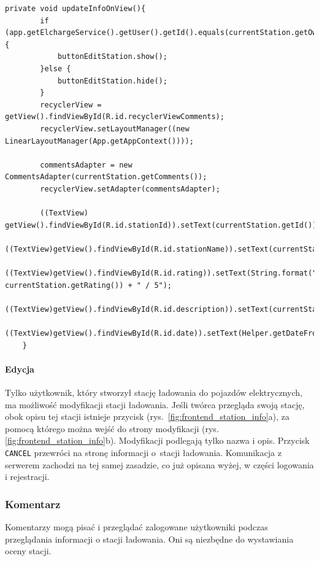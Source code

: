 \begin{lstlisting}[label=list:updateInfoOnView,caption=Odnowienie informacji o stacji na ekranie,basicstyle=\tiny\ttfamily]
    private void updateInfoOnView(){
        if (app.getElchargeService().getUser().getId().equals(currentStation.getOwnerID())){
            buttonEditStation.show();
        }else {
            buttonEditStation.hide();
        }
        recyclerView = getView().findViewById(R.id.recyclerViewComments);
        recyclerView.setLayoutManager((new LinearLayoutManager(App.getAppContext())));

        commentsAdapter = new CommentsAdapter(currentStation.getComments());
        recyclerView.setAdapter(commentsAdapter);

        ((TextView) getView().findViewById(R.id.stationId)).setText(currentStation.getId());
        ((TextView)getView().findViewById(R.id.stationName)).setText(currentStation.getStationName());
        ((TextView)getView().findViewById(R.id.rating)).setText(String.format("%.2f", currentStation.getRating()) + " / 5");
        ((TextView)getView().findViewById(R.id.description)).setText(currentStation.getDescription());
        ((TextView)getView().findViewById(R.id.date)).setText(Helper.getDateFromISO8601(currentStation.getUpdateAt()));
    }
\end{lstlisting}

\paragraph{Edycja\newline}
Tylko użytkownik, który stworzył stację ładowania do pojazdów elektrycznych, ma możliwość modyfikacji stacji ładowania. Jeśli twórca przegląda swoją stację, obok opisu tej stacji istnieje przycisk (rys.~\ref{fig:frontend_station_info}a), za pomocą którego można wejść do strony modyfikacji (rys. \ref{fig:frontend_station_info}b).
Modyfikacji podlegają tylko nazwa i opis. Przycisk \texttt{CANCEL} przewróci na stronę informacji o~stacji ładowania. Komunikacja z serwerem zachodzi na tej samej zasadzie, co już opisana wyżej, w części logowania i rejestracji.

\subsubsection{Komentarz}
Komentarzy mogą pisać i przeglądać zalogowane użytkowniki podczas przeglądania informacji o stacji ładowania. Oni są niezbędne do wystawiania oceny stacji.
